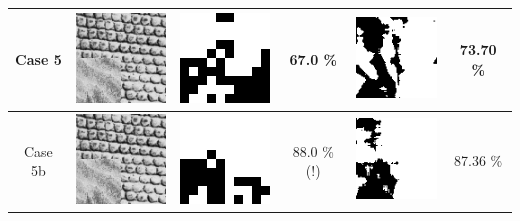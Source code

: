 \documentclass[11pt,twocolumn]{article}
\begin{document}
\begin{table}[ht]
\begin{tabular}{c|c|cc|cc}
Case 5 & \includegraphics[scale=1]{level05.png} & \includegraphics[scale=1]{level05_method1.png} & 67.0 \% & \includegraphics[scale=1]{level05_method2.png} & 73.70 \% \\
\hline
Case 5b & \includegraphics[scale=1]{level05_b.png} & \includegraphics[scale=1]{level05_b_method1.png} & 88.0 \% (!) & \includegraphics[scale=1]{level05_b_method2.png} & 87.36 \% \\

\end{tabular}
\label{tab:gt}

\end{table}%
\end{document}
